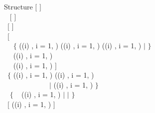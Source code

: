 \begin{DataStructure}{Structure }
$[$   $]$\\
~\moc{:::}  $[$  $]$   \\
~$[$ \moc{:::}    $]$ \\
~$[$       \\
~~  $\{$ ((i) ,  i = 1, )  ((i) ,  i = 1, )  ((i) ,  i = 1, ) $|$  $\}$ \\
~~  ((i) ,  i = 1, ) \\
~~  ((i) ,  i = 1, ) $]$ \\
~$\{$   ((i) ,  i = 1, )  ((i) ,  i = 1, ) \\
~~~~~~~~~~~~~$|$  ((i) ,  i = 1, ) $\}$ \\
~ $\{$  ~
((i) ,  i = 1, ) $|$  $|$  $\}$ \\
~$[$    ((i) ,  i = 1, ) $]$ \\
~\\
\end{DataStructure}

